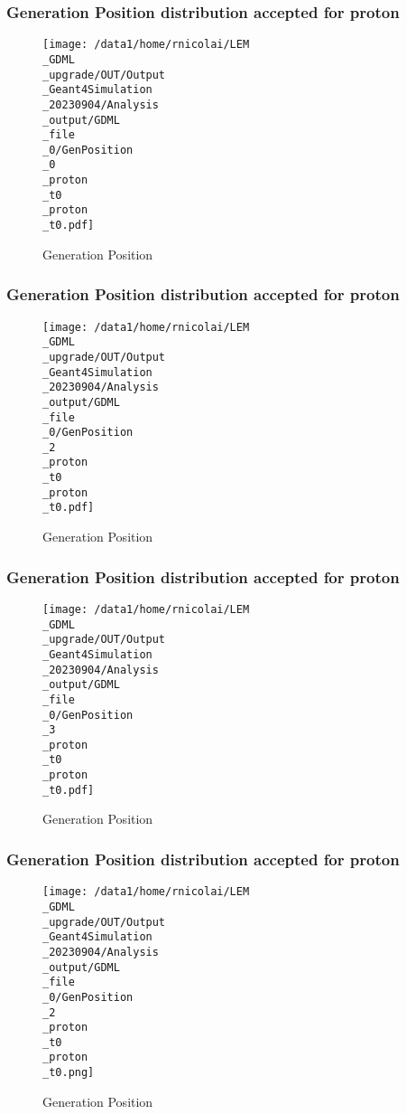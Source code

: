 \documentclass[8pt]{beamer}
\begin{document}
            \begin{frame}
                \frametitle{Generation Position distribution accepted for proton}
            
        \begin{figure}[h]
            \centering
            \texttt{[image: /data1/home/rnicolai/LEM\\\_GDML\\\_upgrade/OUT/Output\\\_Geant4Simulation\\\_20230904/Analysis\\\_output/GDML\\\_file\\\_0/GenPosition\\\_0\\\_proton\\\_t0\\\_proton\\\_t0.pdf]}
            \caption{Generation Position}
        \end{figure}
        
            \end{frame}
            
            \begin{frame}
                \frametitle{Generation Position distribution accepted for proton}
            
        \begin{figure}[h]
            \centering
            \texttt{[image: /data1/home/rnicolai/LEM\\\_GDML\\\_upgrade/OUT/Output\\\_Geant4Simulation\\\_20230904/Analysis\\\_output/GDML\\\_file\\\_0/GenPosition\\\_2\\\_proton\\\_t0\\\_proton\\\_t0.pdf]}
            \caption{Generation Position}
        \end{figure}
        
            \end{frame}
            
            \begin{frame}
                \frametitle{Generation Position distribution accepted for proton}
            
        \begin{figure}[h]
            \centering
            \texttt{[image: /data1/home/rnicolai/LEM\\\_GDML\\\_upgrade/OUT/Output\\\_Geant4Simulation\\\_20230904/Analysis\\\_output/GDML\\\_file\\\_0/GenPosition\\\_3\\\_proton\\\_t0\\\_proton\\\_t0.pdf]}
            \caption{Generation Position}
        \end{figure}
        
            \end{frame}
            
            \begin{frame}
                \frametitle{Generation Position distribution accepted for proton}
            
        \begin{figure}[h]
            \centering
            \texttt{[image: /data1/home/rnicolai/LEM\\\_GDML\\\_upgrade/OUT/Output\\\_Geant4Simulation\\\_20230904/Analysis\\\_output/GDML\\\_file\\\_0/GenPosition\\\_2\\\_proton\\\_t0\\\_proton\\\_t0.png]}
            \caption{Generation Position}
        \end{figure}
        
            \end{frame}
            
\end{document}
